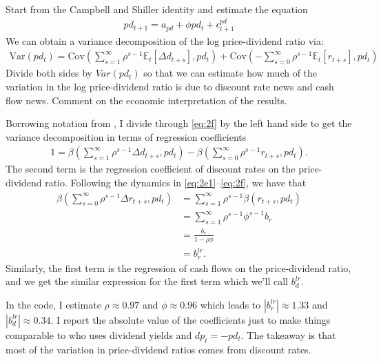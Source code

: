 \begin{answer}[Part f]
Start from the Campbell and Shiller identity and estimate the equation
\begin{align}
pd_{t+1} = a_{pd} + \phi pd_t + \epsilon_{t+1}^{pd} \label{eq:2f}
\end{align}
We can obtain a variance decomposition of the log price-dividend ratio via:
\begin{align}
\text{Var} (pd_t) = \text{Cov} \left( \sum_{s=1}^\infty \rho^{s-1} \mathbb{E}_t [\Delta d_{t+s} ], pd_t \right) 
+ \text{Cov} \left( - \sum_{s=0}^\infty \rho^{s-1} \mathbb{E}_t [r_{t+s} ], pd_t \right) \label{eq:2f}
\end{align}
Divide both sides by $Var(pd_t)$ so that we can estimate how much of the variation in the
log price-dividend ratio is due to discount rate news and cash flow news. Comment on the economic interpretation of the results.
\end{answer}

Borrowing notation from \cite{cochrane2008}, I divide through \eqref{eq:2f} by the left hand side to get the variance decomposition in terms of regression coefficients
\begin{align} 1 = \beta \left( \sum_{s=1}^\infty \rho^{s-1}\Delta d_{t+s} , pd_t \right)  - \beta \left( \sum_{s=0}^\infty \rho^{s-1}r_{t+s} , pd_t \right).
\end{align}
The second term is the regression coefficient of discount rates on the price-dividend ratio. Following the dynamics in \eqref{eq:2e1}--\eqref{eq:2f}, we have that
\begin{align}
\beta \left( \sum_{s=0}^\infty \rho^{s-1}\Delta r_{t+s} , pd_t \right)  &= \sum_{s=1}^\infty \rho^{s-1} \beta (r_{t+s},pd_t ) \\
&= \sum_{s=1}^\infty \rho^{s-1} \phi^{s-1} b_r \\
&= \frac{b_r}{1-\rho \phi} \\
&= b_r^{lr}.
\end{align}
Similarly, the first term is the regression of cash flows on the price-dividend ratio, and we get the similar expression for the first term which we'll call $b_d^{lr}$. 

In the code, I estimate $\rho \approx 0.97$ and $\phi\approx 0.96$ which leads to $|b_r^{lr}| \approx 1.33$ and $|b_d^{lr}| \approx 0.34$. I report the absolute value of the coefficients just to make things comparable to \cite{cochrane2008} who uses dividend yields and $dp_t = - pd_t$. The takeaway is that most of the variation in price-dividend ratios comes from discount rates. 


